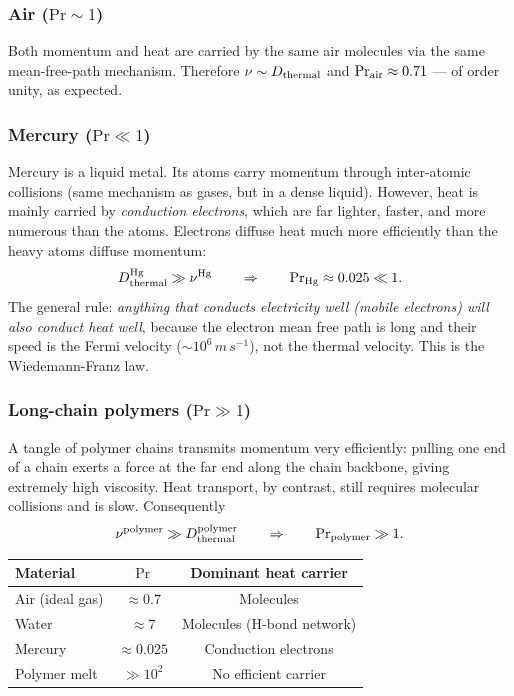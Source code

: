 \subsubsection*{Air ($\mathrm{Pr} \sim 1$)}
Both momentum and heat are carried by the same air molecules via the same
mean-free-path mechanism. Therefore $\nu \sim D_{\rm thermal}$ and
$\mathrm{Pr}_{\rm air} \approx 0.71$ — of order unity, as expected.

\subsubsection*{Mercury ($\mathrm{Pr} \ll 1$)}
Mercury is a liquid metal. Its atoms carry momentum through inter-atomic
collisions (same mechanism as gases, but in a dense liquid). However, heat is
mainly carried by \emph{conduction electrons}, which are far lighter, faster,
and more numerous than the atoms. Electrons diffuse heat much more efficiently
than the heavy atoms diffuse momentum:
\begin{equation}
    D_{\rm thermal}^{\rm Hg} \gg \nu^{\rm Hg}
    \qquad\Rightarrow\qquad
    \mathrm{Pr}_{\rm Hg} \approx 0.025 \ll 1 .
    \label{eq:lec06:pr-mercury}
\end{equation}
The general rule: \emph{anything that conducts electricity well (mobile
electrons) will also conduct heat well}, because the electron mean free path
is long and their speed is the Fermi velocity ($\sim 10^6\,\si{m\,s^{-1}}$),
not the thermal velocity. This is the Wiedemann-Franz law.

\subsubsection*{Long-chain polymers ($\mathrm{Pr} \gg 1$)}
A tangle of polymer chains transmits momentum very efficiently: pulling one
end of a chain exerts a force at the far end along the chain backbone, giving
extremely high viscosity. Heat transport, by contrast, still requires molecular
collisions and is slow. Consequently
\begin{equation}
    \nu^{\rm polymer} \gg D_{\rm thermal}^{\rm polymer}
    \qquad\Rightarrow\qquad
    \mathrm{Pr}_{\rm polymer} \gg 1 .
    \label{eq:lec06:pr-polymer}
\end{equation}

\begin{center}
\begin{tabular}{lcc}
    \toprule
    Material & $\mathrm{Pr}$ & Dominant heat carrier \\
    \midrule
    Air (ideal gas) & $\approx 0.7$ & Molecules \\
    Water & $\approx 7$ & Molecules (H-bond network) \\
    Mercury & $\approx 0.025$ & Conduction electrons \\
    Polymer melt & $\gg 10^2$ & No efficient carrier \\
    \bottomrule
\end{tabular}
\end{center}

